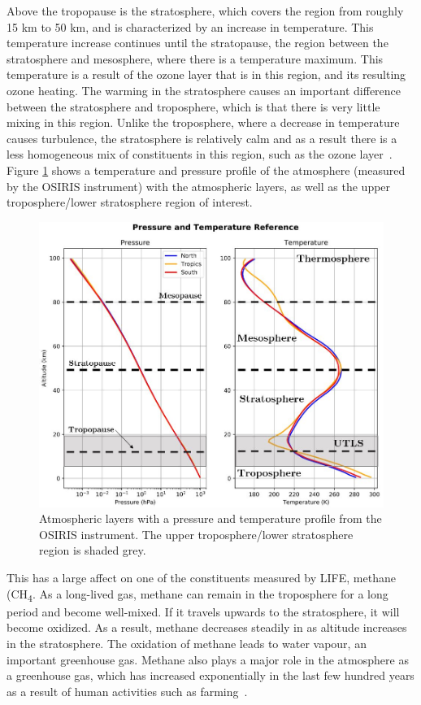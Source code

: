 Above the tropopause is the stratosphere, which covers the region from roughly 15 km to 50 km, and is characterized by an increase in temperature. This temperature increase continues until the stratopause, the region between the stratosphere and mesosphere, where there is a temperature maximum. This temperature is a result of the ozone layer that is in this region, and its resulting ozone heating. The warming in the stratosphere causes an important difference between the stratosphere and troposphere, which is that there is very little mixing in this region. Unlike the troposphere, where a decrease in temperature causes turbulence, the stratosphere is relatively calm and as a result there is a less homogeneous mix of constituents in this region, such as the ozone layer~\citep{atmos_science}. Figure \ref{fig:atm_layers} shows a temperature and pressure profile of the atmosphere (measured by the OSIRIS instrument) with the atmospheric layers, as well as the upper troposphere/lower stratosphere region of interest.

 \begin{figure}
\centering
  \includegraphics[width=\linewidth]{chap2_images/atmospheric_layers.JPG}
  \caption{Atmospheric layers with a pressure and temperature profile from the OSIRIS instrument. The upper troposphere/lower stratosphere region is shaded grey.}
  \label{fig:atm_layers}
\end{figure}

 This has a large affect on one of the constituents measured by LIFE, methane (CH\textsubscript{4}. As a long-lived gas, methane can remain in the troposphere for a long period and become well-mixed. If it travels upwards to the stratosphere, it will become oxidized. As a result, methane decreases steadily in as altitude increases in the stratosphere. The oxidation of methane leads to water vapour, an important greenhouse gas. Methane also plays a major role in the atmosphere as a greenhouse gas, which has increased exponentially in the last few hundred years as a result of human activities such as farming~\citep{atmos_phys_and_climate}. 

